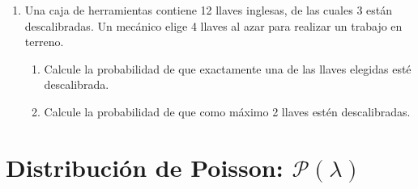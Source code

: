 \documentclass[letterpaper,12pt,spanish]{article}
\begin{document}
\begin{enumerate}[label=\arabic*.]
    \item Una caja de herramientas contiene 12 llaves inglesas, de las cuales 3 están descalibradas. Un mecánico elige 4 llaves al azar para realizar un trabajo en terreno.
    \begin{enumerate}[label=\alph*)]
        \item Calcule la probabilidad de que exactamente una de las llaves elegidas esté descalibrada.
        \item Calcule la probabilidad de que como máximo 2 llaves estén descalibradas.
    \end{enumerate}
\end{enumerate}

\section{Distribución de Poisson: $\mathcal{P}(\lambda)$}
\end{document}
